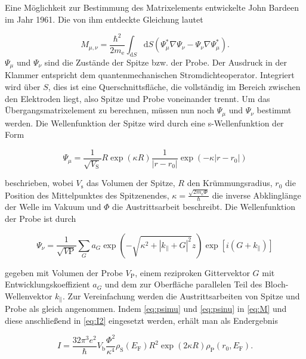 \documentclass[
	a4paper,
	12pt,
	pagesize,
	ngerman
]{scrartcl}
\begin{document}
Eine Möglichkeit zur Bestimmung des Matrixelements entwickelte John Bardeen im Jahr 1961. \cite{1} Die von ihm entdeckte Gleichung lautet

\begin{equation}
	M_{\mu,\nu} = \frac{\hbar^2}{2m_\text{e}} \int_{\text{d}S} \text{d}S(\Psi_\mu^* \nabla \Psi_\nu - \Psi_\nu \nabla \Psi_\mu^*).
	\label{eq:M}
\end{equation}
$\Psi_\mu$ und $\Psi_\nu$ sind die Zustände der Spitze bzw. der Probe. Der Ausdruck in der Klammer entspricht dem quantenmechanischen Stromdichteoperator. Integriert wird über $S$, dies ist eine Querschnittsfläche, die vollständig im Bereich zwischen den Elektroden liegt, also Spitze und Probe voneinander trennt. Um das Übergangsmatrixelement zu berechnen, müssen nun noch $\Psi_\mu$ und $\Psi_\nu$ bestimmt werden. Die Wellenfunktion der Spitze wird durch eine s-Wellenfunktion der Form

\begin{equation}
	\Psi_\mu = \frac{1}{\sqrt{V_\text{S}}} R \exp(\kappa R) \frac{1}{|r-r_0|} \exp(-\kappa|r-r_0|)
	\label{eq:psimu}
\end{equation}

beschrieben, wobei $V_\text{s}$ das Volumen der Spitze, $R$ den Krümmungsradius, $r_0$ die Position des Mittelpunktes des Spitzenendes, $\kappa = \frac{\sqrt{2m_\text{e}\Phi}}{\hbar}$ die inverse Abklinglänge der Welle im Vakuum und $\Phi$ die Austrittsarbeit beschreibt. Die Wellenfunktion der Probe ist durch

\begin{equation}
	\Psi_\nu = \frac{1}{\sqrt{V\text{P}}} \sum_{G} a_G \exp(-\sqrt{\kappa^2 + |k_\parallel + G|^2}z) \exp[i(G + k_\parallel)]
	\label{eq:psinu}
\end{equation}

gegeben mit Volumen der Probe $V_\text{P}$, einem reziproken Gittervektor $G$ mit Entwicklungskoeffizient $a_G$ und dem zur Oberfläche parallelen Teil des Bloch-Wellenvektor $k_\parallel$.
Zur Vereinfachung werden die Austrittsarbeiten von Spitze und Probe als gleich angenommen. Indem \cref{eq:psimu} und \cref{eq:psinu} in \cref{eq:M} und diese anschließend in \cref{eq:I2} eingesetzt werden, erhält man als Endergebnis

\begin{equation}
	I = \frac{32 \pi^3 e^2}{\hbar} V_{\text{b}} \frac{\Phi^2}{\kappa^4} \rho_\text{S}(E_\text{F}) R^2 \exp(2 \kappa R) \rho_\text{P}(r_0, E_\text{F}).
	\label{eq:I3}
\end{equation}
\end{document}
